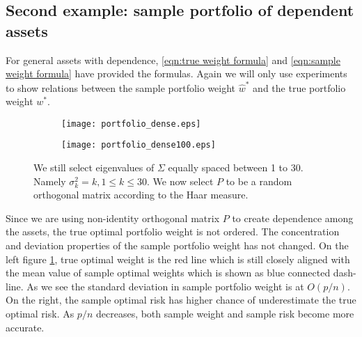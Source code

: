 \documentclass[12pt]{extarticle}
\newcommand{\1}{\mathbbm{1}}
\DeclareMathOperator{\E}{\mathbb{E}}
\numberwithin{equation}{section}
\begin{document}
\subsection{Second example: sample portfolio of dependent assets}


For general assets with dependence, \ref{eqn:true weight formula} and \ref{eqn:sample weight formula} have provided the formulas. Again we will only use experiments to show relations between the sample portfolio weight $\hat{w}^*$ and the true portfolio weight $w^*$.

\begin{figure}[H]
     \centering
     \begin{subfigure}[b]{0.9\textwidth}
         \centering
         \texttt{[image: portfolio\_dense.eps]}
     \end{subfigure} 
    \end{figure}%
\begin{figure}[ht]\ContinuedFloat
 \centering
     \begin{subfigure}[b]{0.9\textwidth}
         \centering
    \texttt{[image: portfolio\_dense100.eps]}
     \end{subfigure}
     \caption{We still select eigenvalues of $\Sigma$ equally spaced between 1 to 30. Namely $\sigma_k^2=k, 1\le k\le 30$. We now select $P$ to be a random orthogonal matrix according to the Haar measure.  }
     \label{fig:dense}
\end{figure}


Since we are using non-identity orthogonal matrix $P$ to create dependence among the assets, the true optimal portfolio weight is not ordered. The concentration and deviation properties of the sample portfolio weight has not changed. On the left figure \ref{fig:dense}, true optimal weight is the red  line which is still closely aligned with the mean value of sample optimal weights which is shown as blue connected dash-line. As we see the standard deviation in sample portfolio weight is at $O(p/n)$.  On the right, the sample optimal risk has higher chance of underestimate the true optimal risk. As $p/n$ decreases, both sample weight and sample risk become more accurate. 


% 

\end{document}
